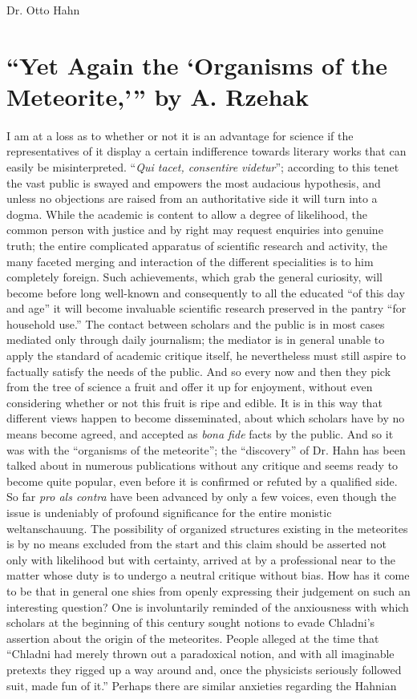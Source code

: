 \documentclass[a4paper, 12pt, oneside]{article}
\begin{document}
Dr. Otto Hahn
\clearpage
\section{``Yet Again the `Organisms of the Meteorite,''' by A. Rzehak}
\paragraph*{}
I am at a loss as to whether or not it is an advantage for science if the representatives of it display a certain indifference towards literary works that can easily be misinterpreted. ``\emph{Qui tacet, consentire videtur}''; according to this tenet the vast public is swayed and empowers the most audacious hypothesis, and unless no objections are raised from an authoritative side it will turn into a dogma. While the academic is content to allow a degree of likelihood, the common person with justice and by right may request enquiries into genuine truth; the entire complicated apparatus of scientific research and activity, the many faceted merging and interaction of the different specialities is to him completely foreign. Such achievements, which grab the general curiosity, will become before long well-known and consequently to all the educated ``of this day and age'' it will become invaluable scientific research preserved in the pantry ``for household use.'' The contact between scholars and the public is in most cases mediated only through daily journalism; the mediator is in general unable to apply the standard of academic critique itself, he nevertheless must still aspire to factually satisfy the needs of the public. And so every now and then they pick from the tree of science a fruit and offer it up for enjoyment, without even considering whether or not this fruit is ripe and edible. It is in this way that different views happen to become disseminated, about which scholars have by no means become agreed, and accepted as \emph{bona fide} facts by the public. And so it was with the ``organisms of the meteorite''; the ``discovery'' of Dr. Hahn has been talked about in numerous publications without any critique and seems ready to become quite popular, even before it is confirmed or refuted by a qualified side. So far \emph{pro als contra} have been advanced by only a few voices, even though the issue is undeniably of profound significance for the entire monistic weltanschauung. The possibility of organized structures existing in the meteorites is by no means excluded from the start and this claim should be asserted not only with likelihood but with certainty, arrived at by a professional near to the matter whose duty is to undergo a neutral critique without bias. How has it come to be that in general one shies from openly expressing their judgement on such an interesting question? One is involuntarily reminded of the anxiousness with which scholars at the beginning of this century sought notions to evade Chladni's assertion about the origin of the meteorites. People alleged at the time that ``Chladni had merely thrown out a paradoxical notion, and with all imaginable pretexts they rigged up a way around and, once the physicists seriously followed suit, made fun of it.'' Perhaps there are similar anxieties regarding the Hahnian 
\end{document}
